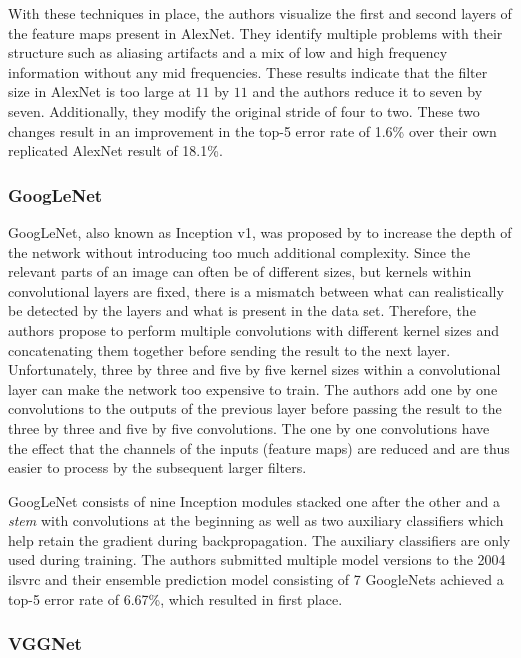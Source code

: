 \documentclass[draft,final]{vutinfth} %
\begin{document}
With these techniques in place, the authors visualize the first and
second layers of the feature maps present in AlexNet. They identify
multiple problems with their structure such as aliasing artifacts and
a mix of low and high frequency information without any mid
frequencies. These results indicate that the filter size in AlexNet is
too large at $11$ by $11$ and the authors reduce it to seven by
seven. Additionally, they modify the original stride of four to
two. These two changes result in an improvement in the top-5 error
rate of 1.6\% over their own replicated AlexNet result of 18.1\%.

\subsubsection{GoogLeNet}
\label{sssec:theory-googlenet}

GoogLeNet, also known as Inception v1, was proposed by
\textcite{szegedy2015} to increase the depth of the network without
introducing too much additional complexity. Since the relevant parts
of an image can often be of different sizes, but kernels within
convolutional layers are fixed, there is a mismatch between what can
realistically be detected by the layers and what is present in the
data set. Therefore, the authors propose to perform multiple
convolutions with different kernel sizes and concatenating them
together before sending the result to the next layer. Unfortunately,
three by three and five by five kernel sizes within a convolutional
layer can make the network too expensive to train. The authors add one
by one convolutions to the outputs of the previous layer before
passing the result to the three by three and five by five
convolutions. The one by one convolutions have the effect that the
channels of the inputs (feature maps) are reduced and are thus easier
to process by the subsequent larger filters.

GoogLeNet consists of nine Inception modules stacked one after the
other and a \emph{stem} with convolutions at the beginning as well as
two auxiliary classifiers which help retain the gradient during
backpropagation. The auxiliary classifiers are only used during
training. The authors submitted multiple model versions to the 2004
\gls{ilsvrc} and their ensemble prediction model consisting of 7
GoogleNets achieved a top-5 error rate of 6.67\%, which resulted in
first place.

\subsubsection{VGGNet}
\label{sssec:theory-vggnet}
\end{document}
